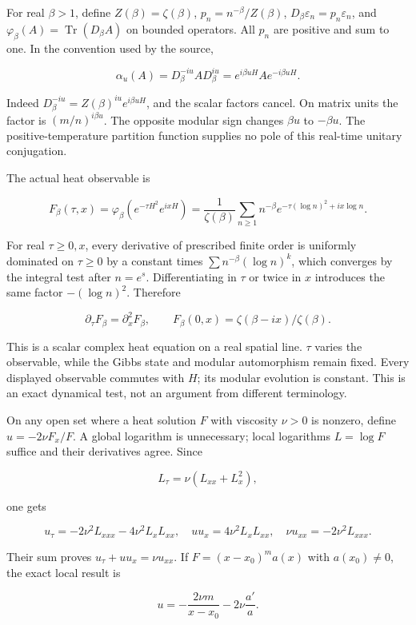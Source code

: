 For real \(\beta>1\), define \(Z(\beta)=\zeta(\beta)\), \(p_n=n^{-\beta}/Z(\beta)\), \(D_\beta\varepsilon_n=p_n\varepsilon_n\), and \(\varphi_{\beta}(A)=\operatorname{Tr}(D_{\beta} A)\) on bounded operators. All \(p_n\) are positive and sum to one. In the convention used by the source,

\[
\alpha_u(A)=D_\beta^{-iu}AD_\beta^{iu}
=e^{i\beta uH}Ae^{-i\beta uH}.
\]

Indeed \(D_{\beta}^{-iu}=Z(\beta)^{iu}e^{i \beta uH}\), and the scalar factors cancel. On matrix units the factor is \((m/n)^{i \beta u}\). The opposite modular sign changes \(\beta u\) to \(-\beta u\). The positive-temperature partition function supplies no pole of this real-time unitary conjugation.

The actual heat observable is

\[
F_\beta(\tau,x)=\varphi_\beta(e^{-\tau H^2}e^{ixH})
=\frac1{\zeta(\beta)}\sum_{n\ge1}n^{-\beta}
e^{-\tau(\log n)^2+ix\log n}.
\]

For real \(\tau\ge 0,x\), every derivative of prescribed finite order is uniformly dominated on \(\tau\ge 0\) by a constant times \(\sum n^{-\beta}(\log n)^k\), which converges by the integral test after \(n=e^s\). Differentiating in \(\tau\) or twice in \(x\) introduces the same factor \(-(\log n)^2\). Therefore

\[
\partial_\tau F_\beta=\partial_x^2F_\beta,
\qquad F_\beta(0,x)=\zeta(\beta-ix)/\zeta(\beta).
\]

This is a scalar complex heat equation on a real spatial line. \(\tau\) varies the observable, while the Gibbs state and modular automorphism remain fixed. Every displayed observable commutes with \(H\); its modular evolution is constant. This is an exact dynamical test, not an argument from different terminology.

On any open set where a heat solution \(F\) with viscosity \(\nu>0\) is nonzero, define \(u=-2 \nu F_x/F\). A global logarithm is unnecessary; local logarithms \(L=\log F\) suffice and their derivatives agree. Since

\[
L_\tau=\nu(L_{xx}+L_x^2),
\]

one gets

\[
u_\tau=-2\nu^2L_{xxx}-4\nu^2L_xL_{xx},\quad
uu_x=4\nu^2L_xL_{xx},\quad
\nu u_{xx}=-2\nu^2L_{xxx}.
\]

Their sum proves \(u_{\tau}+u u_x=\nu u_{xx}\). If \(F=(x-x_0)^m a(x)\) with \(a(x_0)\ne 0\), the exact local result is

\[
u=-\frac{2\nu m}{x-x_0}-2\nu\frac{a'}a.
\]

